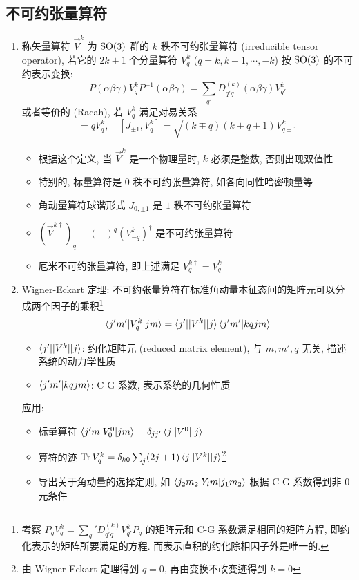\documentclass[12pt,a4paper]{article}%
\numberwithin{equation}{section}%
\DeclareMathOperator\Tr{Tr}
\begin{document}
\subsection{不可约张量算符} %
\label{sub:tensor_op}
\begin{enumerate}
	\item 称矢量算符 $\vec V^k$ 为 $\mathrm{SO}(3)$ 群的 $k$ 秩不可约张量算符 (irreducible tensor operator), 若它的 $2k+1$ 个分量算符 $V_q^k$ ($q = k, k-1, \cdots, -k$) 按 $\mathrm{SO}(3)$ 的不可约表示变换:
	\begin{equation}
		P(\alpha\beta\gamma) V_q^k P^{-1}(\alpha\beta\gamma) = \sum_{q'} D^{(k)}_{q'q}(\alpha\beta\gamma) V_{q'}^k
	\end{equation}
	或者等价的 (Racah), 若 $V_q^{k}$ 满足对易关系
	\begin{equation}
		[J_z, V_q^k] = qV_q^k,\quad [J_{\pm1}, V_q^k] = \sqrt{(k\mp q)(k\pm q + 1)} V_{q\pm 1}^k
	\end{equation}
	\begin{itemize}
		\item 根据这个定义, 当 $\vec V^k$ 是一个物理量时, $k$ 必须是整数, 否则出现双值性
		\item 特别的, 标量算符是 $0$ 秩不可约张量算符, 如各向同性哈密顿量等
		\item 角动量算符球谐形式 $J_{0,\pm1}$ 是 $1$ 秩不可约张量算符
		\item $(\vec V^{k\dagger})_q\equiv (-)^q(V^k_{-q})^\dagger$ 是不可约张量算符
		\item 厄米不可约张量算符, 即上述满足 $V^{k\dagger}_q = V^k_q$
	\end{itemize}
	\item Wigner-Eckart 定理: 不可约张量算符在标准角动量本征态间的矩阵元可以分成两个因子的乘积\footnote{考察 $P_gV^k_q = \sum_q' D^{(k)}_{q'q}V_{q'}^kP_g$ 的矩阵元和 C-G 系数满足相同的矩阵方程, 即约化表示的矩阵所要满足的方程. 而表示直积的约化除相因子外是唯一的.}
	\begin{equation}
		\braket{j'm'|V_q^k|jm} = \braket{j'||V^k||j}\braket{j'm'|kqjm}
	\end{equation}
	\begin{itemize}
		\item $\braket{j'||V^k||j}$: 约化矩阵元 (reduced matrix element), 与 $m, m', q$ 无关, 描述系统的动力学性质
		\item $\braket{j'm'|kqjm}$: C-G 系数, 表示系统的几何性质
	\end{itemize}
	应用: 
	\begin{itemize}
		\item 标量算符 $\braket{j'm|V^0_0|jm} = \delta_{jj'}\braket{j||V^0||j}$
		\item 算符的迹 $\Tr V_q^k = \delta_{k0}\sum_j(2j+1)\braket{j||V^k||j}$\footnote{由 Wigner-Eckart 定理得到 $q=0$, 再由变换不改变迹得到 $k=0$}
		\item 导出关于角动量的选择定则, 如 $\braket{j_2m_2|Y_lm|j_1m_2}$ 根据 C-G 系数得到非 $0$ 元条件
	\end{itemize}
\end{enumerate}
\end{document}
